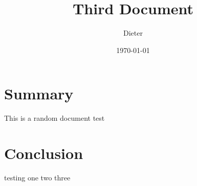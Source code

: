 \documentclass{article}
\title{Third Document}
\author{Dieter}
\date{\today}
\begin{document}
\maketitle

\section{Summary}

This is a random document test

\section{Conclusion}

testing one two three
\end{document}
